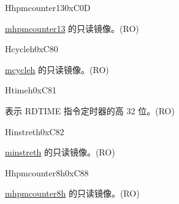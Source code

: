 \begin{register}{H}{hpmcounter13}{0xC0D}\label{regdesc:HPMCOUNTER13}
%
\regnewline%
\begin{regdesc}\begin{reglist}
\label{fielddesc:HPMCOUNTER13}\item [HPMCOUNTER13] \hyperref[regdesc:MHPMCOUNTER13]{mhpmcounter13} 的只读镜像。(RO)
\end{reglist}\end{regdesc}
\end{register}


\begin{register}{H}{cycleh}{0xC80}\label{regdesc:CYCLEH}
%
\regnewline%
\begin{regdesc}\begin{reglist}
\label{fielddesc:CYCLEH}\item [CYCLEH] \hyperref[regdesc:MCYCLEH]{mcycleh} 的只读镜像。(RO)
\end{reglist}\end{regdesc}
\end{register}

\begin{register}{H}{timeh}{0xC81}\label{regdesc:TIMEH}
%
\regnewline%
\begin{regdesc}\begin{reglist}
\label{fielddesc:TIMEH}\item [TIMEH] 表示 RDTIME 指令定时器的高 32 位。(RO)
\end{reglist}\end{regdesc}
\end{register}

\begin{register}{H}{instreth}{0xC82}\label{regdesc:INSTRETH}
%
\regnewline%
\begin{regdesc}\begin{reglist}
\label{fielddesc:INSTRETH}\item [INSTRETH] \hyperref[regdesc:MINSTRETH]{minstreth} 的只读镜像。(RO)
\end{reglist}\end{regdesc}
\end{register}

\begin{register}{H}{hpmcounter8h}{0xC88}\label{regdesc:HPMCOUNTER8H}
%
\regnewline%
\begin{regdesc}\begin{reglist}
\label{fielddesc:HPMCOUNTER8H}\item [HPMCOUNTER8H] \hyperref[regdesc:MHPMCOUNTER8H]{mhpmcounter8h} 的只读镜像。(RO)
\end{reglist}\end{regdesc}
\end{register}

